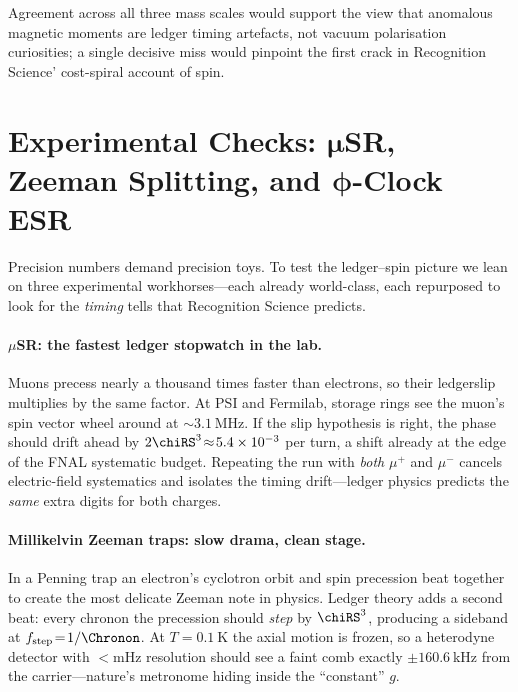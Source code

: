 \documentclass[11pt,oneside]{book}
\begin{document}
Agreement across all three mass scales would support the view that
anomalous magnetic moments are ledger timing artefacts, not vacuum
polarisation curiosities; a single decisive miss would pinpoint the
first crack in Recognition Science’ cost-spiral account of spin.


\section{Experimental Checks:
           $\boldsymbol{\mu}$SR, Zeeman Splitting,
           and $\boldsymbol{\phi}$-Clock ESR}
\label{sec:gchecks-narrative}

Precision numbers demand precision toys.  
To test the ledger–spin picture we lean on three experimental
workhorses—each already world-class, each repurposed to look for the
\emph{timing} tells that Recognition Science predicts.

\paragraph{$\mu$SR: the fastest ledger stopwatch in the lab.}
Muons precess nearly a thousand times faster than electrons, so their
ledgerslip multiplies by the same factor.  
At PSI and Fermilab, storage rings see the muon’s spin vector wheel
around at $\sim\!3.1$ MHz.  If the slip hypothesis is right, the
phase should drift ahead by
$2\chiRS^{3}\!\approx\!5.4\times10^{-3}$ per turn, a shift already at
the edge of the FNAL systematic budget.  
Repeating the run with \emph{both} $\mu^{+}$ and $\mu^{-}$ cancels
electric-field systematics and isolates the timing drift—ledger
physics predicts the \emph{same} extra digits for both charges.

\paragraph{Millikelvin Zeeman traps: slow drama, clean stage.}
In a Penning trap an electron’s cyclotron orbit and spin precession
beat together to create the most delicate Zeeman note in physics.
Ledger theory adds a second beat: every chronon the precession should
\emph{step} by $\chiRS^{3}$, producing a sideband at
$f_{\mathrm{step}}\!=\!1/\Chronon$.  
At $T\!=\!0.1$ K the axial motion is frozen, so a heterodyne detector
with $<$mHz resolution should see a faint comb exactly
$\pm160.6$ kHz from the carrier—nature’s metronome hiding inside the
“constant” $g$.
\end{document}
